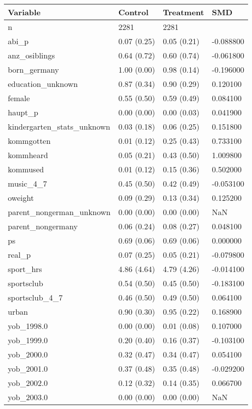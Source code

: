 \begin{tabular}{llll}
\toprule
Variable & Control & Treatment & SMD \\
\midrule
n & 2281 & 2281 &  \\
abi\_p & 0.07 (0.25) & 0.05 (0.21) & -0.088800 \\
anz\_osiblings & 0.64 (0.72) & 0.60 (0.74) & -0.061800 \\
born\_germany & 1.00 (0.00) & 0.98 (0.14) & -0.196000 \\
education\_unknown & 0.87 (0.34) & 0.90 (0.29) & 0.120100 \\
female & 0.55 (0.50) & 0.59 (0.49) & 0.084100 \\
haupt\_p & 0.00 (0.00) & 0.00 (0.03) & 0.041900 \\
kindergarten\_stats\_unknown & 0.03 (0.18) & 0.06 (0.25) & 0.151800 \\
kommgotten & 0.01 (0.12) & 0.25 (0.43) & 0.733100 \\
kommheard & 0.05 (0.21) & 0.43 (0.50) & 1.009800 \\
kommused & 0.01 (0.12) & 0.15 (0.36) & 0.502000 \\
music\_4\_7 & 0.45 (0.50) & 0.42 (0.49) & -0.053100 \\
oweight & 0.09 (0.29) & 0.13 (0.34) & 0.125200 \\
parent\_nongerman\_unknown & 0.00 (0.00) & 0.00 (0.00) & NaN \\
parent\_nongermany & 0.06 (0.24) & 0.08 (0.27) & 0.048100 \\
ps & 0.69 (0.06) & 0.69 (0.06) & 0.000000 \\
real\_p & 0.07 (0.25) & 0.05 (0.21) & -0.079800 \\
sport\_hrs & 4.86 (4.64) & 4.79 (4.26) & -0.014100 \\
sportsclub & 0.54 (0.50) & 0.45 (0.50) & -0.183100 \\
sportsclub\_4\_7 & 0.46 (0.50) & 0.49 (0.50) & 0.064100 \\
urban & 0.90 (0.30) & 0.95 (0.22) & 0.168900 \\
yob\_1998.0 & 0.00 (0.00) & 0.01 (0.08) & 0.107000 \\
yob\_1999.0 & 0.20 (0.40) & 0.16 (0.37) & -0.103100 \\
yob\_2000.0 & 0.32 (0.47) & 0.34 (0.47) & 0.054100 \\
yob\_2001.0 & 0.37 (0.48) & 0.35 (0.48) & -0.029200 \\
yob\_2002.0 & 0.12 (0.32) & 0.14 (0.35) & 0.066700 \\
yob\_2003.0 & 0.00 (0.00) & 0.00 (0.00) & NaN \\
\bottomrule
\end{tabular}
